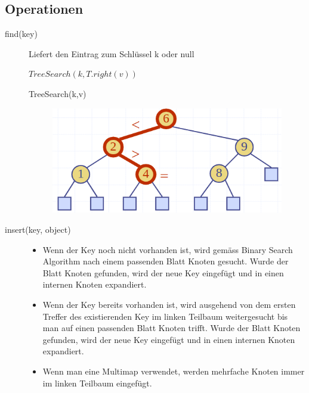 \subsection{Operationen}
\begin{description}
	\item[find(key)] \hfill
	Liefert den Eintrag zum Schlüssel k oder null
	\begin{algorithm}
		\begin{algorithmic}[1]
			\ENDIF
			\ELSE
			\RETURN$TreeSearch(k, T.right(v))$
			\ENDIF
		\end{algorithmic}
		\caption{TreeSearch(k,v)}
	\end{algorithm}
	\begin{figure}[ht!]
		\centering
		\begin{minipage}[t]{0.4\textwidth}
			\centering
			\includegraphics[width=0.9\linewidth]{images/binary_search_find}
			\label{fig:binary search find()}
		\end{minipage}
	\end{figure}
\clearpage
	\item[insert(key, object)] \hfill
	\begin{itemize}
		\item Wenn der Key noch nicht vorhanden ist, wird gemäss Binary Search Algorithm nach einem passenden Blatt Knoten gesucht. Wurde der Blatt Knoten gefunden, wird der neue Key eingefügt und in einen internen Knoten expandiert.
		\item Wenn der Key bereits vorhanden ist, wird ausgehend von dem ersten Treffer des existierenden Key im linken Teilbaum weitergesucht bis man auf einen passenden Blatt Knoten trifft. Wurde der Blatt Knoten gefunden, wird der neue Key eingefügt und in einen internen Knoten expandiert.
		\item Wenn man eine Multimap verwendet, werden mehrfache Knoten immer im linken Teilbaum eingefügt.

\end{itemize}
\end{description}
